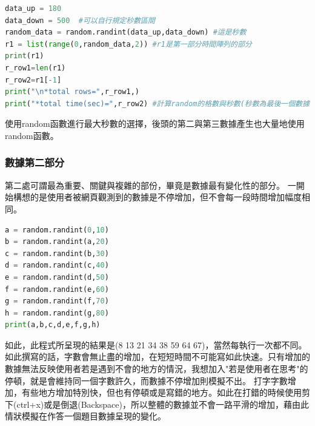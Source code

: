 

\lstset{style=mystyle}

\begin{lstlisting}[language=Python,caption=python數據第一部分]
data_up = 180
data_down = 500  #可以自行規定秒數區間
random_data = random.randint(data_up,data_down) #這是秒數
r1 = list(range(0,random_data,2)) #r1是第一部分時間陣列的部分
print(r1)
r_row1=len(r1)
r_row2=r1[-1]
print("\n*total rows=",r_row1,)
print("*total time(sec)=",r_row2) #計算random的格數與秒數(秒數為最後一個數據)
\end{lstlisting}
使用random函數進行最大秒數的選擇，後頭的第二與第三數據產生也大量地使用random函數。
\subsubsection{數據第二部分}
第二處可謂最為重要、關鍵與複雜的部份，畢竟是數據最有變化性的部分。
一開始構想的是使用者被網頁觀測到的數據是不停增加，但不會每一段時間增加幅度相同。

\begin{lstlisting}[language=Python,caption=python數據第二部分]
a = random.randint(0,10)
b = random.randint(a,20)
c = random.randint(b,30)
d = random.randint(c,40)
e = random.randint(d,50)
f = random.randint(e,60)
g = random.randint(f,70)
h = random.randint(g,80)
print(a,b,c,d,e,f,g,h)
\end{lstlisting}
如此，此程式所呈現的結果是(8 13 21 34 38 59 64 67)，當然每執行一次都不同。
如此撰寫的話，字數會無止盡的增加，在短短時間不可能寫如此快速。只有增加的數據無法反映使用者若是遇到不會的地方的情況，我想加入"若是使用者在思考"的停頓，就是會維持同一個字數許久，而數據不停增加則模擬不出。
打字字數增加，有些地方增加特別快，但也有停頓或是寫錯的地方。如此在打錯的時候使用剪下(ctrl+x)或是倒退(Backspace)，所以整體的數據並不會一路平滑的增加，藉由此情狀模擬在作答一個題目數據呈現的變化。

